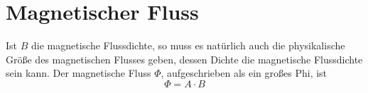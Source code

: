 \documentclass{article}
\begin{document}
\section{Magnetischer Fluss}  
Ist $B$ die magnetische Flussdichte, so muss es natürlich auch die physikalische Größe des magnetischen Flusses geben, dessen Dichte die magnetische Flussdichte sein kann. Der magnetische Fluss $\Phi$, aufgeschrieben als ein großes Phi, ist
\[
 \Phi = A \cdot B 
\] 
\end{document}

